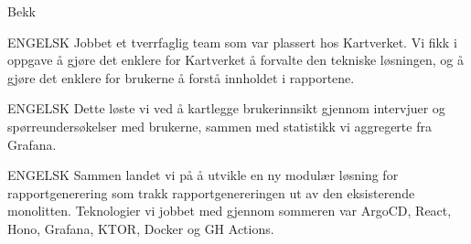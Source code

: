 \cventry
  {}
  {Bekk}
  {}
  {}

\begin{cvbullets}
  \item \enor
    {ENGELSK}
    {Jobbet et tverrfaglig team som var plassert hos Kartverket. Vi fikk i oppgave å gjøre det enklere for Kartverket å forvalte den tekniske løsningen, og å gjøre det enklere for brukerne å forstå innholdet i rapportene.}
  \item \enor
    {ENGELSK}
    {Dette løste vi ved å kartlegge brukerinnsikt gjennom intervjuer og spørreundersøkelser med brukerne, sammen med statistikk vi aggregerte fra Grafana.}
  \item \enor
    {ENGELSK}
    {Sammen landet vi på å utvikle en ny modulær løsning for rapportgenerering som trakk rapportgenereringen ut av den eksisterende monolitten. Teknologier vi jobbet med gjennom sommeren var ArgoCD, React, Hono, Grafana, KTOR, Docker og GH Actions.}
    
\end{cvbullets}